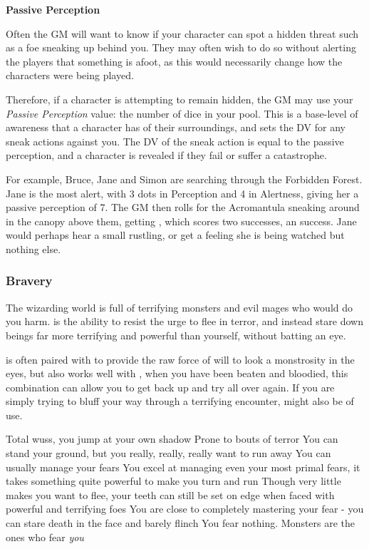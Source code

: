 {\bf Passive Perception}

Often the GM will want to know if your character can spot a hidden threat such as a foe sneaking up behind you. They may often wish to do so without alerting the players that something is afoot, as this would necessarily change how the characters were being played. 

Therefore, if a character is attempting to remain hidden, the GM may use your {\it Passive Perception} value: the number of dice in your  pool. This is a base-level of awareness that a character has of their surroundings, and sets the DV for any sneak actions against you. The DV of the sneak action is equal to the passive perception, and a character is revealed if they fail or suffer a catastrophe. 

For example, Bruce, Jane and Simon are searching through the Forbidden Forest. Jane is the most alert, with 3 dots in Perception and 4 in Alertness, giving her a passive perception of 7. The GM then rolls for the Acromantula sneaking around in the canopy above them, getting , which scores two successes, an  success. Jane would perhaps hear a small rustling, or get a feeling she is being watched but nothing else. 


\subsubsection{Bravery}

The wizarding world is full of terrifying monsters and evil mages who would do you harm.  is the ability to resist the urge to flee in terror, and instead stare down beings far more terrifying and powerful than yourself, without batting an eye. 

 is often paired with  to provide the raw force of will to look a monstrosity in the eyes, but also works well with , when you have been beaten and bloodied, this combination can allow you to get back up and try all over again. If you are simply trying to bluff your way through a terrifying encounter,  might also be of use. 

\ratingTable
{Total wuss, you jump at your own shadow}
{Prone to bouts of terror}
{You can stand your ground, but you really, really, really want to run away}
{You can usually manage your fears}
{You excel at managing even your most primal fears, it takes something quite powerful to make you turn and run}
{Though very little makes you want to flee, your teeth can still be set on edge when faced with powerful and terrifying foes}
{You are close to completely mastering your fear - you can stare death in the face and barely flinch}
{You fear nothing. Monsters are the ones who fear {\it you} }

